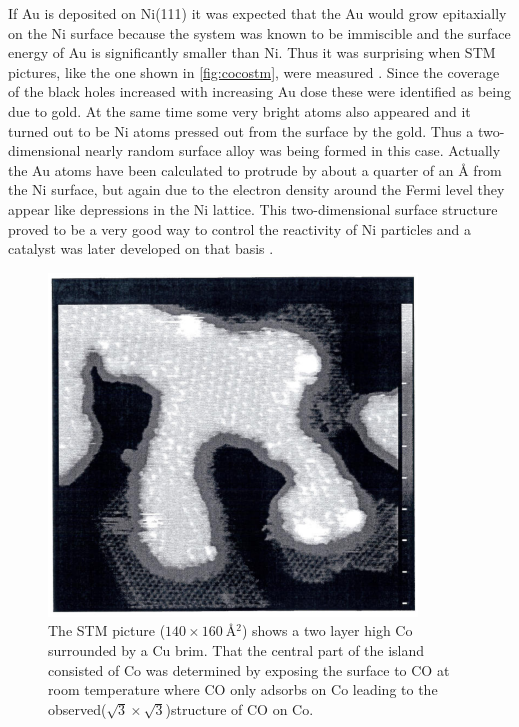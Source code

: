 If Au is deposited on Ni(111) it was expected that the Au would grow epitaxially on the Ni surface because the system was known to be immiscible and the surface energy of Au is significantly smaller than Ni. Thus it was surprising when STM pictures, like the one shown in \autoref{fig:cocostm}, were measured \cite{Besenbacher3}. Since the coverage of the black holes increased with increasing Au dose these were identified as being due to gold. At the same time some very bright atoms also appeared and it turned out to be Ni atoms pressed out from the surface by the gold. Thus a two-dimensional nearly random surface alloy was being formed in this case. Actually the Au atoms have been calculated to protrude by about a quarter of an \si{\angstrom} from the Ni surface, but again due to the electron density around the Fermi level  they appear like depressions in the Ni lattice. This two-dimensional surface structure proved to be a very good way to control the  reactivity of Ni particles and a catalyst was later developed on that basis \cite{Science}.

\begin{figure}[h!]
	\begin{center}
	\includegraphics[scale=4]{figures/10_13.png}
	\caption{The STM picture ($140\times \SI{160}{\angstrom^2}$) shows a two layer high Co surrounded by a Cu brim. That the central part of the island consisted of Co was determined by exposing the surface to CO at room temperature where CO only adsorbs on Co leading to the observed($\sqrt{3}\times\sqrt{3}$)structure of CO on Co.}
	\label{fig:cocostm}
	\end{center}
\end{figure}

